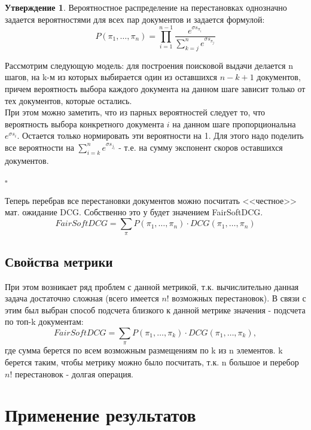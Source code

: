 \documentclass[14pt,a4paper]{amsart}
\theoremstyle{definition}
\theoremstyle{definition}
\newtheorem{claim}{Утверждение}[section]
\newenvironment{theoremproof}
{\par\noindent{\bf Доказательство}}
{\hfill$\scriptstyle \square$}
\newcommand{\Sum}{\sum\limits}
\begin{document}
\begin{claim}
Вероятностное распределение на перестановках однозначно задается вероятностями для всех пар документов и задается формулой:
$$P(\pi_1,\dots,\pi_n) = \prod\limits_{i=1}^{n - 1} \frac{e^{\sigma s_{\pi_i}}}{\Sum_{k=j}^n e^{\sigma s_{\pi_j}}}$$
\end{claim}

\begin{theoremproof}
Рассмотрим следующую модель: для построения поисковой выдачи делается n шагов, на k-м из которых выбирается один из оставшихся $n - k + 1$ документов, причем вероятность выбора каждого документа на данном шаге зависит только от тех документов, которые остались. \\

При этом можно заметить, что из парных вероятностей следует то, что вероятность выбора конкретного документа $i$ на данном шаге пропорциональна $e^{\sigma s_i}$. Остается только нормировать эти вероятности на 1. Для этого надо поделить все вероятности на $\Sum_{i = k}^n e^{\sigma s_{j_i}}$ - т.е. на сумму экспонент скоров оставшихся документов.

\end{theoremproof}

Теперь перебрав все перестановки документов можно посчитать <<честное>> мат. ожидание DCG. Собственно это у будет значением FairSoftDCG.
$$FairSoftDCG = \Sum_{\pi} P(\pi_1,\dots,\pi_n) \cdot DCG(\pi_1,\dots,\pi_n)$$

\subsection{Свойства метрики}

При этом возникает ряд проблем с данной метрикой, т.к. вычислительно данная задача достаточно сложная (всего имеется $n!$ возможных перестановок). В связи с этим был выбран способ подсчета близкого к данной метрике значения - подсчета по топ-k документам:
$$FairSoftDCG = \Sum_\pi P(\pi_1,\dots,\pi_k) \cdot DCG(\pi_1,\dots,\pi_k),$$ где сумма берется по всем возможным размещениям по k из n элементов. k берется таким, чтобы метрику можно было посчитать, т.к. n большое и перебор $n!$ перестановок - долгая операция.



\newpage
\section{Применение результатов}
\end{document}
